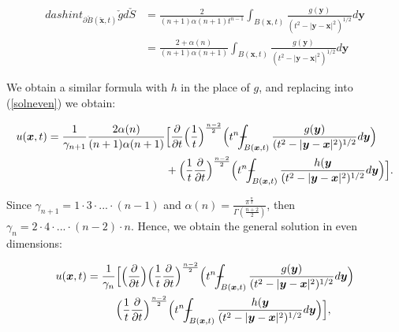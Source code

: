 \documentclass[a4paper, 12pt]{article}
\def\Xint#1{\mathchoice
{\XXint\displaystyle\textstyle{#1}}%
{\XXint\textstyle\scriptstyle{#1}}%
{\XXint\scriptstyle\scriptscriptstyle{#1}}%
{\XXint\scriptscriptstyle\scriptscriptstyle{#1}}%
\!\int}
\def\XXint#1#2#3{{\setbox0=\hbox{$#1{#2#3}{\int}$ }
\vcenter{\hbox{$#2#3$ }}\kern-.6\wd0}}
\def\dashint{\Xint-}
\numberwithin{equation}{section}
\begin{document}
 \begin{equation*}
    \begin{aligned}
        dashint_{\partial \check{B}(\check{\boldsymbol{x}}, t)} \check{g}d\check{S}&=\frac{2}{(n+1)\alpha(n+1)t^{n-1}}\int_{B(\boldsymbol{x},t)}\frac{g(\boldsymbol{y})}{(t^2-|\boldsymbol{y}-\boldsymbol{x}|^2)^{1/2}}d\boldsymbol{y}\\
        &=\frac{2+\alpha(n)}{(n+1)\alpha(n+1)}\int_{B(\boldsymbol{x},t)}\frac{g(\boldsymbol{y})}{(t^2-|\boldsymbol{y}-\boldsymbol{x}|^2)^{1/2}}d \boldsymbol{y}
    \end{aligned}
\end{equation*}

We obtain a similar formula with $h$ in the place of $g$, and replacing into
(\ref{solneven}) we obtain:

\begin{equation*}
    \begin{split}
        u(\boldsymbol{x}, t)= \frac{1}{\gamma_{n+1}} \frac{2 \alpha(n)}{(n+1) \alpha (n+1)}&\Big[ \diffp[1]{}{t} \Big(\frac{1}{t} \Big)^{\frac{n-2}{2}} \Big(t^n \dashint_{B(\boldsymbol{x}, t)} \frac{g(\boldsymbol{y})}{(t^2-|\boldsymbol{y}-\boldsymbol{x}|^2)^{1/2}} d \boldsymbol{y} \Big)\\ 
        & +\Big(\frac{1}{t} \diffp[1]{}{t}\Big)^{\frac{n-2}{2}} \Big(t^n \dashint_{B(\boldsymbol{x},t)} \frac{h(\boldsymbol{y}}{(t^2-|\boldsymbol{y}-\boldsymbol{x}|^2)^{1/2}} d \boldsymbol{y} \Big) \Big].
    \end{split}
\end{equation*}

Since $\gamma_{n+1}=1 \cdot 3 \cdot ... \cdot (n-1)$ and
$\alpha(n)=\frac{\pi^{\frac{n}{2}}}{\Gamma(\frac{n+2}{2})}$, then $\gamma_n=2
\cdot 4 \cdot ... \cdot(n-2) \cdot n$. Hence, we obtain the general solution in
even dimensions:

\begin{equation} \label{solnev}
    \begin{split}
        u(\boldsymbol{x}, t)= \frac{1}{\gamma_n} &\Big[ \Big(\diffp[1]{}{t}\Big) \Big(\frac{1}{t} \diffp[1]{}{t}\Big)^{\frac{n-2}{2}}\Big(t^n \dashint_{B(\boldsymbol{x}, t)} \frac{g(\boldsymbol{y})}{(t^2-|\boldsymbol{y}-\boldsymbol{x}|^2)^{1/2}} d \boldsymbol{y} \Big)\\
        &\Big(\frac{1}{t} \diffp[1]{}{t}\Big)^{\frac{n-2}{2}}\Big(t^n \dashint_{B(\boldsymbol{x},t)} \frac{h(\boldsymbol{y}}{(t^2-|\boldsymbol{y}-\boldsymbol{x}|^2)^{1/2}} d \boldsymbol{y} \Big) \Big],
    \end{split}
\end{equation}
\end{document}
